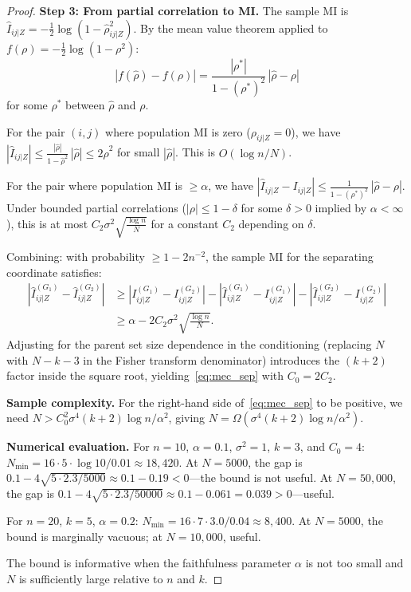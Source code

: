\documentclass{article}
\theoremstyle{definition}
\theoremstyle{plain}
\theoremstyle{remark}
\begin{document}
\begin{proof}
\textbf{Step 3: From partial correlation to MI.}
The sample MI is $\widehat{I}_{ij|Z} = -\frac{1}{2}\log(1 - \hat{\rho}_{ij|Z}^2)$.
By the mean value theorem applied to $f(\rho) = -\frac{1}{2}\log(1 - \rho^2)$:
$$|f(\hat{\rho}) - f(\rho)| = \frac{|\rho^*|}{1 - (\rho^*)^2}\,|\hat{\rho} - \rho|$$
for some $\rho^*$ between $\hat{\rho}$ and $\rho$.

For the pair $(i, j)$ where population MI is zero ($\rho_{ij|Z} = 0$), we have
$|\widehat{I}_{ij|Z}| \leq \frac{|\hat{\rho}|}{1 - \hat{\rho}^2}\,|\hat{\rho}|
\leq 2\hat{\rho}^2$ for small $|\hat{\rho}|$. This is $O(\log n / N)$.

For the pair where population MI is $\geq \alpha$, we have
$|\widehat{I}_{ij|Z} - I_{ij|Z}| \leq \frac{1}{1 - (\rho^*)^2}\,|\hat{\rho} - \rho|$.
Under bounded partial correlations ($|\rho| \leq 1 - \delta$ for some $\delta > 0$
implied by $\alpha < \infty$), this is at most
$C_2\sigma^2\sqrt{\frac{\log n}{N}}$ for a constant $C_2$ depending on $\delta$.

Combining: with probability $\geq 1 - 2n^{-2}$, the sample MI for the separating
coordinate satisfies:
\begin{align}
  |\widehat{I}_{ij|Z}^{(G_1)} - \widehat{I}_{ij|Z}^{(G_2)}|
  &\geq |I_{ij|Z}^{(G_1)} - I_{ij|Z}^{(G_2)}|
    - |\widehat{I}_{ij|Z}^{(G_1)} - I_{ij|Z}^{(G_1)}|
    - |\widehat{I}_{ij|Z}^{(G_2)} - I_{ij|Z}^{(G_2)}| \\
  &\geq \alpha - 2C_2\sigma^2\sqrt{\frac{\log n}{N}}.
\end{align}
Adjusting for the parent set size dependence in the conditioning (replacing
$N$ with $N - k - 3$ in the Fisher transform denominator) introduces the
$(k+2)$ factor inside the square root, yielding~\eqref{eq:mec_sep} with
$C_0 = 2C_2$.

\textbf{Sample complexity.} For the right-hand side of~\eqref{eq:mec_sep} to
be positive, we need
$N > C_0^2 \sigma^4 (k+2) \log n / \alpha^2$, giving
$N = \Omega(\sigma^4(k+2)\log n / \alpha^2)$.

\textbf{Numerical evaluation.}
For $n = 10$, $\alpha = 0.1$, $\sigma^2 = 1$, $k = 3$, and $C_0 = 4$:
$N_{\min} = 16 \cdot 5 \cdot \log 10 / 0.01 \approx 18{,}420$. At $N = 5000$,
the gap is $0.1 - 4\sqrt{5 \cdot 2.3 / 5000} \approx 0.1 - 0.19 < 0$---the
bound is not useful. At $N = 50{,}000$, the gap is
$0.1 - 4\sqrt{5 \cdot 2.3 / 50000} \approx 0.1 - 0.061 = 0.039 > 0$---useful.

For $n = 20$, $k = 5$, $\alpha = 0.2$: $N_{\min} = 16 \cdot 7 \cdot 3.0 / 0.04
\approx 8{,}400$. At $N = 5000$, the bound is marginally vacuous; at
$N = 10{,}000$, useful.

The bound is informative when the faithfulness parameter $\alpha$ is not too
small and $N$ is sufficiently large relative to $n$ and $k$.
\end{proof}
\end{document}
